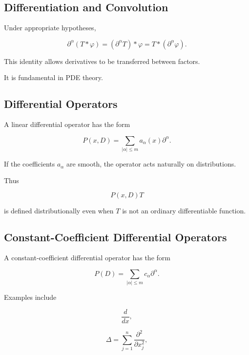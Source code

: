 \subsection{Differentiation and Convolution}
\label{subsec:differentiation-convolution-distributions}

Under appropriate hypotheses,

\[
\boxed{
\partial^\alpha(T*\varphi)
=
(\partial^\alpha T)*\varphi
=
T*(\partial^\alpha\varphi).
}
\]

This identity allows derivatives to be transferred between factors.

It is fundamental in PDE theory.

\subsection{Differential Operators}
\label{subsec:distribution-differential-operators}

A linear differential operator has the form

\[
\boxed{
P(x,D)
=
\sum_{|\alpha|\leq m}
a_\alpha(x)\partial^\alpha.
}
\]

If the coefficients \(a_\alpha\) are smooth, the operator acts naturally
on distributions.

Thus

\[
\boxed{
P(x,D)T
}
\]

is defined distributionally even when \(T\) is not an ordinary
differentiable function.

\subsection{Constant-Coefficient Differential Operators}
\label{subsec:constant-coefficient-operators}

A constant-coefficient differential operator has the form

\[
\boxed{
P(D)
=
\sum_{|\alpha|\leq m}
c_\alpha\partial^\alpha.
}
\]

Examples include

\[
\boxed{
\frac{d}{dx},
}
\]

\[
\boxed{
\Delta
=
\sum_{j=1}^{n}
\frac{\partial^2}{\partial x_j^2},
}
\]

